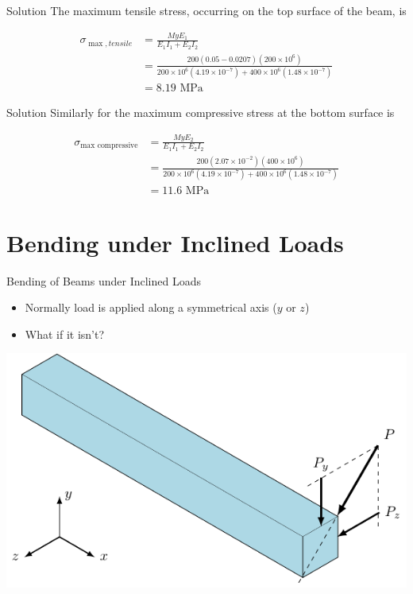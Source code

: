 \documentclass[10pt, svgnames]{beamer}
\begin{document}
\begin{frame}[label={sec:org95129f4}]{Solution}
The maximum tensile stress, occurring on the top surface of the
beam, is

\begin{align*}
  \sigma_{\max,tensile} &= \frac{MyE_1}{E_1I_1 + E_2I_2} \\
                             &= \frac{200(0.05 - 0.0207)(200 \times 10^6)}{200 \times 10^6(4.19 \times 10^{-7}) + 400 \times 10^6(1.48 \times 10^{ -7})} \\
                             &= 8.19 \text{ MPa}
\end{align*}
\end{frame}

\begin{frame}[label={sec:org87a8ef7}]{Solution}
Similarly for the maximum compressive stress at the bottom surface is

\begin{align*}
  \sigma_{\max \text{ compressive}} &= \frac{MyE_2}{E_1I_1 + E_2I_2} \\
                                 &= \frac{200(2.07 \times 10^{ - 2})(400 \times 10^6)}{200 \times 10^6(4.19 \times 10^{-7}) + 400 \times 10^6(1.48 \times 10^{-7})} \\
                                 &= 11.6 \text{ MPa}
\end{align*}
\end{frame}

\section{Bending under Inclined Loads}
\label{bending-under-inclined-loads}
\begin{frame}[label={sec:orgbd6f973}]{Bending of Beams under Inclined Loads}
\begin{itemize}
\item Normally load is applied along a symmetrical axis (\(y\) or \(z\))

\item What if it isn't?
\end{itemize}

\begin{center}
\includegraphics[width=.9\linewidth]{pictures/inclined-loads.pdf}
\end{center}
\end{frame}
\end{document}
